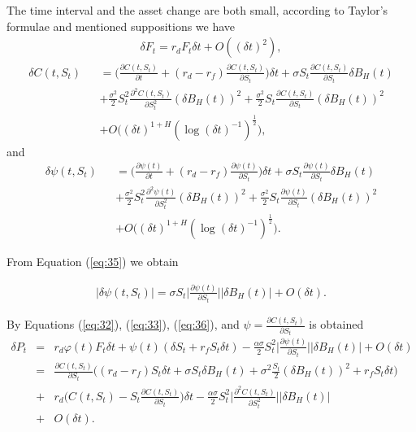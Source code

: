 \documentclass[a4paper,11pt]{amsart}
\numberwithin{equation}{section}
\theoremstyle{definition}
\theoremstyle{plain}
\theoremstyle{definition}
\newcommand{\1}{\mathbf{1}}
\begin{document}
The time interval and the asset change are both small, according to Taylor's formulae and mentioned suppositions we have
\begin{eqnarray}
\delta F_t=r_dF_t\delta t+O((\delta t)^2),
\label{eq:33}
\end{eqnarray}
\begin{eqnarray}
\delta C(t,S_t)&&=\Big(\frac{\partial C(t,S_t)}{\partial t}+(r_d-r_f)\frac{\partial C(t,S_t)}{\partial S_t}\Big)\delta t+\sigma S_t \frac{\partial C(t,S_t)}{\partial S_t}\delta B_H(t)\nonumber\\
&&+\frac{\sigma^2}{2}S_t^2\frac{\partial^2C(t,S_t)}{\partial S_t^2}(\delta B_H(t))^2+\frac{\sigma^2}{2}S_t\frac{\partial C(t,S_t)}{\partial S_t}(\delta B_H(t))^2\nonumber\\
&&+O\Big((\delta t)^{1+H}(\log(\delta t)^{-1})^{\frac{1}{2}}\Big),
\label{eq:34}
\end{eqnarray}
and
\begin{eqnarray}
\delta \psi(t,S_t)&&=\Big(\frac{\partial \psi(t)}{\partial t}+(r_d-r_f)\frac{\partial \psi(t)}{\partial S_t}\Big)\delta t+\sigma S_t \frac{\partial \psi(t)}{\partial S_t}\delta B_H(t)\nonumber\\
&&+\frac{\sigma^2}{2}S_t^2\frac{\partial^2\psi(t)}{\partial S_t^2}(\delta B_H(t))^2+\frac{\sigma^2}{2}S_t\frac{\partial \psi(t)}{\partial S_t}(\delta B_H(t))^2\nonumber\\
&&+O\Big((\delta t)^{1+H}(\log(\delta t)^{-1})^{\frac{1}{2}}\Big).
\label{eq:35}
\end{eqnarray}

From Equation (\ref{eq:35}) we obtain

\begin{eqnarray}
|\delta \psi(t,S_t)|=\sigma S_t\Big|\frac{\partial \psi(t)}{\partial S_t}\Big||\delta B_H(t)|+O(\delta t).
\label{eq:36}
\end{eqnarray}

By Equations (\ref{eq:32}), (\ref{eq:33}), (\ref{eq:36}), and $\psi=\frac{\partial C(t,S_t)}{\partial S_t}$ is obtained
\begin{eqnarray}
\delta P_t&=&r_d\varphi(t)F_t\delta t+\psi(t)(\delta S_t+r_fS_t\delta t)-\frac{\alpha \sigma}{2}S_t^2\Big|\frac{\partial \psi(t)}{\partial S_t}\Big||\delta B_H(t)|+O(\delta t)\nonumber\\
&=&\frac{\partial C(t,S_t)}{\partial S_t}\Big((r_d-r_f)S_t\delta t+\sigma S_t\delta B_H(t)+\sigma^2\frac{S_t}{2}(\delta B_H(t))^2+r_f S_t\delta t\Big)\nonumber\\
&+&r_d\Big(C(t,S_t)-S_t\frac{\partial C(t,S_t)}{\partial S_t}\Big)\delta t-\frac{\alpha \sigma}{2}S_t^2\Big|\frac{\partial^2C(t,S_t)}{\partial S_t^2}\Big||\delta B_H(t)|\label{eq:37}\\
&+&O(\delta t)\nonumber.
\end{eqnarray}
\end{document}
